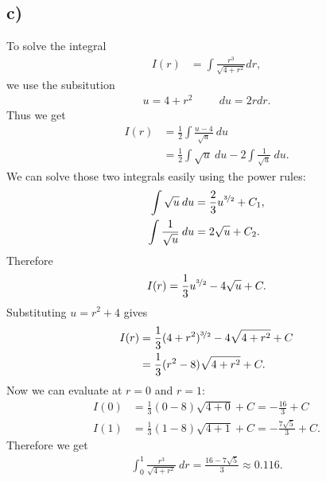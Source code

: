 \documentclass{article}
\begin{document}
\subsection*{c)}
To solve the integral
\begin{align*}
	I(r) & = \int \frac{r^3}{\sqrt{4+r^2}}dr,
\end{align*}
we use the subsitution
\begin{align*}
	u = 4+r^2 \hspace{1cm}  du = 2rdr.
\end{align*}
Thus we get
\begin{align*}
	I(r) & = \frac{1}{2}\int \frac{u-4}{\sqrt{u}}\:du                    \\
	     & =\frac{1}{2}\int\sqrt{u}\:du - 2 \int \frac{1}{\sqrt{u}}\:du.
\end{align*}
We can solve those two integrals easily using the power rules:
\begin{align*}
	\int \sqrt{u}\:du           & =\frac{2}{3}u^{\nicefrac{3}{2}}+C_1, \\
	\int \frac{1}{\sqrt{u}}\:du & =2\sqrt{u}+C_2.
\end{align*}
Therefore
\begin{align*}
	I(r) = \frac{1}{3}u^{\nicefrac{3}{2}}-4\sqrt{u}+C.
\end{align*}
Substituting $u=r^2+4$ gives
\begin{align*}
	I(r) & = \frac{1}{3}(4+r^2)^{\nicefrac{3}{2}}-4\sqrt{4+r^2} + C \\
	     & = \frac{1}{3}(r^2-8)\sqrt{4+r^2}+C.
\end{align*}
Now we can evaluate at $r=0$ and $r=1$:
\begin{align*}
	I(0) & =\frac{1}{3}(0-8)\sqrt{4+0}+C=-\frac{16}{3}+C         \\
	I(1) & =\frac{1}{3}(1-8)\sqrt{4+1}+C=-\frac{7\sqrt{5}}{3}+C.
\end{align*}
Therefore we get
\begin{align*}
	\int_0^1\frac{r^3}{\sqrt{4+r^2}}\:dr = \frac{16-7\sqrt{5}}{3} \approx 0.116.
\end{align*}
\end{document}

